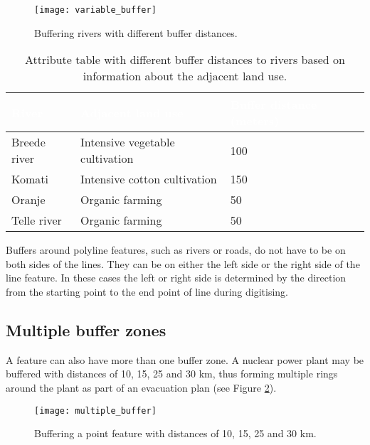 \begin{figure}[ht]
   \begin{center}
   \caption{Buffering rivers with different buffer distances.}
\label{fig:riverbuffer}\smallskip
   \texttt{[image: variable\_buffer]}
\end{center}
\end{figure}

\begin{table}[ht]
\centering
\caption{Attribute table with different buffer distances to rivers based on
information about the adjacent land use.}\medskip
 \label{tab:buffer}
 \begin{tabular}{|p{5cm}|p{6cm}|p{5cm}|}
 \hline
 \rowcolor{black}
 \textcolor{white}{\textbf{River}} &
 \textcolor{white}{\textbf{Adjacent land use}} &
 \textcolor{white}{\textbf{Buffer distance (meters)}} \\
 \hline Breede river & Intensive vegetable cultivation & 100 \\
 \hline Komati & Intensive cotton cultivation & 150 \\
 \hline Oranje & Organic farming & 50 \\
 \hline Telle river & Organic farming & 50 \\
\hline
\end{tabular}
\end{table}

Buffers around polyline features, such as rivers or roads, do not have to be
on both sides of the lines. They can be on either the left side or the right
side of the line feature. In these cases the left or right side is determined
by the direction from the starting point to the end point of line during
digitising.  

\subsection{Multiple buffer zones}

A feature can also have more than one buffer zone. A nuclear power plant may
be buffered with distances of 10, 15, 25 and 30 km, thus forming multiple
rings around the plant as part of an evacuation plan (see Figure
\ref{fig:powerplant}).  

\begin{figure}[ht]
   \begin{center}
   \caption{Buffering a point feature with distances of 10, 15, 25 and 30 km.}
\label{fig:powerplant}\smallskip
   \texttt{[image: multiple\_buffer]}
\end{center}
\end{figure}


